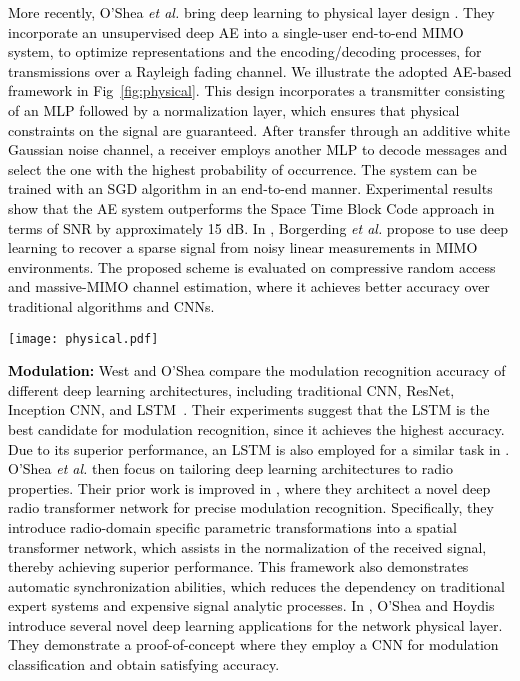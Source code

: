 \documentclass[journal,comsoc,letter]{IEEEtran}
\newcommand{\edit}[1]{\textcolor{black}{#1}}
\newcommand{\rev}[1]{\textcolor{black}{#1}}
\begin{document}
\edit{
More recently, O'Shea \emph{et al.} bring deep learning to physical layer design \cite{o2017deep}. They incorporate an unsupervised deep AE into a single-user end-to-end MIMO system, to optimize representations and the encoding/decoding processes, for transmissions over a Rayleigh fading channel. \rev{We illustrate the adopted AE-based framework in Fig~\ref{fig:physical}. This design incorporates a transmitter consisting of an MLP followed by a normalization layer, which ensures that physical constraints on the signal are guaranteed. After transfer through an additive white Gaussian noise channel, a receiver employs another MLP to decode messages and select the one with the highest probability of occurrence. The system can be trained with an SGD algorithm in an end-to-end manner.} Experimental results show that the AE system outperforms the Space Time Block Code approach in terms of SNR by approximately 15 dB. In \cite{borgerding2017amp}, Borgerding \emph{et al.} propose to use deep learning to recover a sparse signal from noisy linear measurements in MIMO environments. The proposed scheme is evaluated on compressive random access and massive-MIMO channel estimation, where it achieves better accuracy over traditional algorithms and CNNs. \\}

\begin{figure*}[t]
\begin{center}
\texttt{[image: physical.pdf]}
\end{center}
\caption{\label{fig:physical} \rev{A communications system over an additive white Gaussian noise channel represented as an autoencoder.}}
\end{figure*}
\noindent\edit{
\textbf{Modulation:} 
West and O'Shea compare the modulation recognition accuracy of different deep learning architectures, including traditional CNN, ResNet, Inception CNN, and LSTM~\cite{west2017deep}. Their experiments suggest that the LSTM is the best candidate for modulation recognition, since it achieves the highest accuracy. Due to its superior performance, an LSTM is also employed for a similar task in \cite{rajendran2017distributed}. O'Shea \emph{et al.} then focus on tailoring deep learning architectures to radio properties. Their prior work is improved in \cite{o2016radio}, where they architect a novel deep radio transformer network for precise modulation recognition. Specifically, they introduce radio-domain specific parametric transformations into a spatial transformer network, which assists in the normalization of the received signal, thereby achieving superior performance. This framework also demonstrates automatic synchronization abilities, which reduces the dependency on traditional expert systems and expensive signal analytic processes. In \cite{timothy2017introduction}, O'Shea and Hoydis introduce several novel deep  learning applications for the network physical layer. They demonstrate a proof-of-concept where they employ a CNN for modulation classification and obtain satisfying accuracy.}\\
\end{document}
